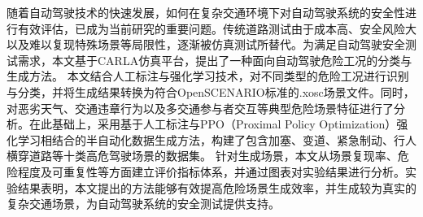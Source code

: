 \begin{abstractzh}

随着自动驾驶技术的快速发展，如何在复杂交通环境下对自动驾驶系统的安全性进行有效评估，已成为当前研究的重要问题。传统道路测试由于成本高、安全风险大以及难以复现特殊场景等局限性，逐渐被仿真测试所替代。为满足自动驾驶安全测试需求，本文基于CARLA仿真平台，提出了一种面向自动驾驶危险工况的分类与生成方法。
本文结合人工标注与强化学习技术，对不同类型的危险工况进行识别与分类，并将生成结果转换为符合OpenSCENARIO标准的.xosc场景文件。同时，对恶劣天气、交通违章行为以及多交通参与者交互等典型危险场景特征进行了分析。在此基础上，采用基于人工标注与PPO（Proximal Policy Optimization）强化学习相结合的半自动化数据生成方法，构建了包含加塞、变道、紧急制动、行人横穿道路等十类高危驾驶场景的数据集。
针对生成场景，本文从场景复现率、危险程度及可重复性等方面建立评价指标体系，并通过图表对实验结果进行分析。实验结果表明，本文提出的方法能够有效提高危险场景生成效率，并生成较为真实的复杂交通场景，为自动驾驶系统的安全测试提供支持。


\end{abstractzh}
